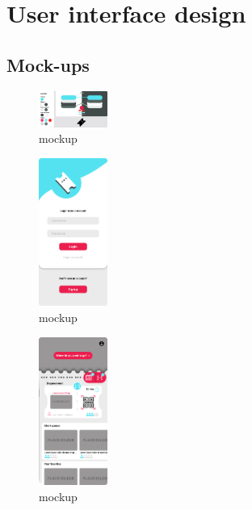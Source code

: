 \section{User interface design}
\label{sect:userinterfacedesign}

\subsection{Mock-ups}
\label{subsect:mockups}

\begin{figure}[h!]
    \centering
    \includegraphics[width=0.2\textwidth]{mockups/colours.png}
    \caption{\label{fig:mockup}mockup}
\end{figure}

\begin{figure}[h!]
    \centering
    \includegraphics[width=0.2\textwidth]{mockups/LoginPage.png}
    \caption{\label{fig:mockup}mockup}
\end{figure}

\begin{figure}[h!]
    \centering
    \includegraphics[width=0.2\textwidth]{mockups/HomePage.png}
    \caption{\label{fig:mockup}mockup}
\end{figure}

